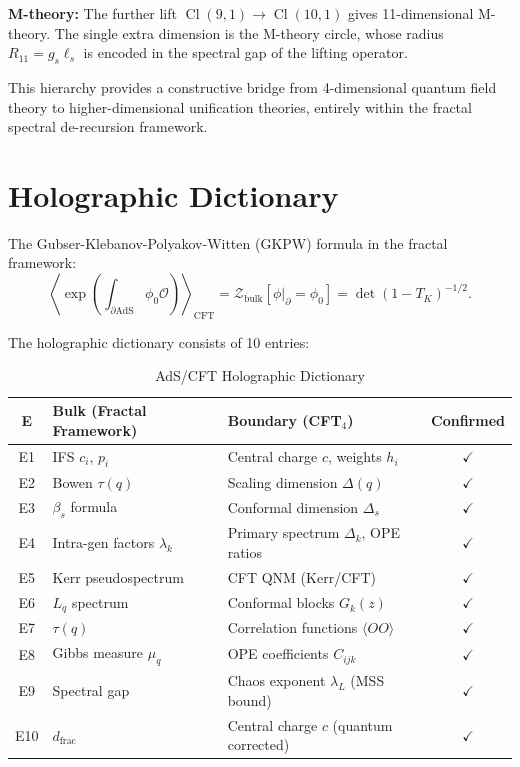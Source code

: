 \documentclass[12pt,a4paper]{article}
\newcommand{\Cl}{\operatorname{Cl}}
\begin{document}
\textbf{M-theory:} The further lift $\Cl(9,1) \to \Cl(10,1)$ gives 11-dimensional 
M-theory. The single extra dimension is the M-theory circle, whose radius 
$R_{11} = g_s \ell_s$ is encoded in the spectral gap of the lifting operator.

This hierarchy provides a constructive bridge from 4-dimensional quantum field 
theory to higher-dimensional unification theories, entirely within the 
fractal spectral de-recursion framework.

\section{Holographic Dictionary}
\label{sec:holography}

The Gubser-Klebanov-Polyakov-Witten (GKPW) formula in the fractal framework:
\begin{equation}
\left\langle \exp\left(\int_{\partial\text{AdS}} \phi_0 \mathcal{O}\right)\right\rangle_{\text{CFT}}
= \mathcal{Z}_{\text{bulk}}[\phi|_\partial = \phi_0] = \det(1 - T_K)^{-1/2}.
\end{equation}

The holographic dictionary consists of 10 entries:

\begin{table}[h]
\centering
\caption{AdS/CFT Holographic Dictionary}
\label{tab:holography}
\begin{tabular}{c|p{4cm}|p{4cm}|c}
\hline
E & Bulk (Fractal Framework) & Boundary (CFT$_4$) & Confirmed \\
\hline
E1 & IFS $c_i$, $p_i$ & Central charge $c$, weights $h_i$ & $\checkmark$ \\
E2 & Bowen $\tau(q)$ & Scaling dimension $\Delta(q)$ & $\checkmark$ \\
E3 & $\beta_s$ formula & Conformal dimension $\Delta_s$ & $\checkmark$ \\
E4 & Intra-gen factors $\lambda_k$ & Primary spectrum $\Delta_k$, OPE ratios & $\checkmark$ \\
E5 & Kerr pseudospectrum & CFT QNM (Kerr/CFT) & $\checkmark$ \\
E6 & $L_q$ spectrum & Conformal blocks $G_k(z)$ & $\checkmark$ \\
E7 & $\tau(q)$ & Correlation functions $\langle OO\rangle$ & $\checkmark$ \\
E8 & Gibbs measure $\mu_q$ & OPE coefficients $C_{ijk}$ & $\checkmark$ \\
E9 & Spectral gap & Chaos exponent $\lambda_L$ (MSS bound) & $\checkmark$ \\
E10 & $d_{\text{frac}}$ & Central charge $c$ (quantum corrected) & $\checkmark$ \\
\hline
\end{tabular}
\end{table}
\end{document}
